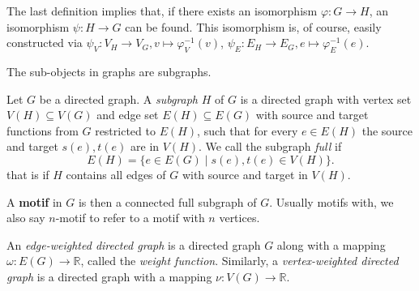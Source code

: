 \begin{remark}
  The last definition implies that, if there exists an isomorphism
  $\varphi: G \to H$, an isomorphism $\psi: H \to G$ can be
  found. This isomorphism is, of course, easily constructed via
  $\psi_V: V_H \to V_G, v \mapsto \varphi_V^{-1}(v)$, $\psi_E: E_H \to
  E_G, e \mapsto \varphi_E^{-1}(e)$.
\end{remark}


The sub-objects in graphs are subgraphs.

\begin{definition}[Subgraph]
  Let $G$ be a directed graph. A \textit{subgraph} $H$ of $G$ is a
  directed graph with vertex set $V(H) \subseteq V(G)$ and edge set
  $E(H) \subseteq E(G)$ with source and target functions from $G$
  restricted to $E(H)$, such that for every $e \in E(H)$ the source
  and target $s(e),t(e)$ are in $V(H)$. We call the subgraph
  \textit{full} if 
  \[
    E(H) = \{e \in E(G) \mid s(e), t(e) \in V(H)\}.
  \]
  that is if $H$ contains all edges of $G$ with source and target in
  $V(H)$.
\end{definition}

A \textbf{motif} in $G$ is then a connected full subgraph of
$G$. Usually motifs with, we also say $n$-motif to refer to a motif
with $n$ vertices.


\begin{definition}
  An \textit{edge-weighted directed graph} is a directed graph $G$ along
  with a mapping $\omega: E(G) \to \mathbb{R}$, called the
  \textit{weight function}. Similarly, a \textit{vertex-weighted
    directed graph} is a directed graph with a mapping $\nu: V(G) \to
  \mathbb{R}$.
\end{definition}







